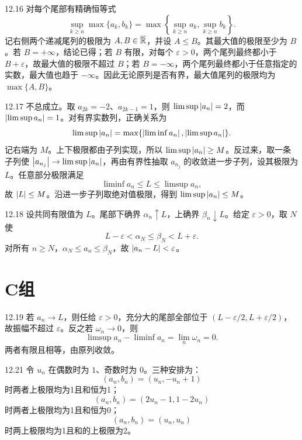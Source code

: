 \begin{solution}{12.16}
对每个尾部有精确恒等式
\[
 \sup_{k\ge n}\max\{a_k,b_k\}
 =\max\left\{\sup_{k\ge n}a_k,\sup_{k\ge n}b_k\right\}.
\]
记右侧两个递减尾列的极限为 \(A,B\in\overline{\mathbb{R}}\)，并设 \(A\le B\)。其最大值的极限至少为 \(B\)。若 \(B=+\infty\)，结论已得；若 \(B\) 有限，对每个 \(\varepsilon>0\)，两个尾列最终都小于 \(B+\varepsilon\)，故最大值的极限不超过 \(B\)；若 \(B=-\infty\)，两个尾列最终都小于任意指定的实数，最大值也趋于 \(-\infty\)。因此无论原列是否有界，最大值尾列的极限均为 \(\max\{A,B\}\)。
\end{solution}

\begin{solution}{12.17}
不总成立。取 \(a_{2k}=-2\)、\(a_{2k-1}=1\)，则
\(\limsup\left|a_n\right|=2\)，而
\(\left|\limsup a_n\right|=1\)。对有界实数列，正确关系为
\[
 \limsup\left|a_n\right|
 =\max\{\left|\liminf a_n\right|,\left|\limsup a_n\right|\}.
\]
记右端为 \(M\)。上下极限都由子列实现，所以
\(\limsup\left|a_n\right|\ge M\)。反过来，取一条子列使
\(\left|a_{n_j}\right|\to\limsup\left|a_n\right|\)，再由有界性抽取
\(a_{n_j}\) 的收敛进一步子列，设其极限为 \(L\)。任意部分极限满足
\[
 \liminf a_n\le L\le\limsup a_n,
\]
故 \(\left|L\right|\le M\)。沿进一步子列取绝对值极限，得到
\(\limsup\left|a_n\right|\le M\)。
\end{solution}

\begin{solution}{12.18}
设共同有限值为 \(L\)。尾部下确界 \(\alpha_n\uparrow L\)，上确界
\(\beta_n\downarrow L\)。给定 \(\varepsilon>0\)，取 \(N\) 使
\[
 L-\varepsilon<\alpha_N\le\beta_N<L+\varepsilon.
\]
对所有 \(n\ge N\)，\(\alpha_N\le a_n\le\beta_N\)，故
\(\left|a_n-L\right|<\varepsilon\)。
\end{solution}

\section*{C组}

\begin{solution}{12.19}
若 \(a_n\to L\)，则任给 \(\varepsilon>0\)，充分大的尾部全部位于
\((L-\varepsilon/2,L+\varepsilon/2)\)，故振幅不超过 \(\varepsilon\)。反之若 \(\omega_n\to0\)，则
\[
 \limsup a_n-\liminf a_n
 =\lim_n\omega_n=0.
\]
两者有限且相等，由原列收敛。
\end{solution}

\begin{solution}{12.21}
令 \(u_n\) 在偶数时为 \(1\)、奇数时为 \(0\)。三种安排为：
\[
 (a_n,b_n)=(u_n,-u_n+1)
\]
时两者上极限均为1且和恒为1；
\[
 (a_n,b_n)=(2u_n-1,1-2u_n)
\]
时两者上极限均为1且和恒为0；
\[
 (a_n,b_n)=(u_n,u_n)
\]
时两上极限均为1且和的上极限为2。
\end{solution}

